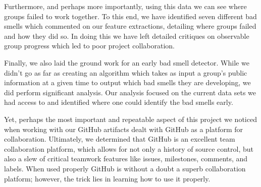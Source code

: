 \documentclass{acm_proc_article-sp}
\begin{document}
Furthermore, and perhaps more importantly, using this data we can see where groups failed to work together. To this end, we have identified seven different bad smells which commented on our feature extractions, detailing where groups failed and how they did so. In doing this we have left detailed critiques on observable group progress which led to poor project collaboration.

Finally, we also laid the ground work for an early bad smell detector. While we didn't go as far as creating an algorithm which takes as input a group's public information at a given time to output which bad smells they are developing, we did perform significant analysis. Our analysis focused on the current data sets we had access to and identified where one could identify the bad smells early.

Yet, perhaps the most important and repeatable aspect of this project we noticed when working with our GitHub artifacts dealt with GitHub as a platform for collaboration. Ultimately, we determined that GitHub is an excellent team collaboration platform, which allows for not only a history of source control, but also a slew of critical teamwork features like issues, milestones, comments, and labels. When used properly GitHub is without a doubt a superb collaboration platform; however, the trick lies in learning how to use it properly.




\end{document}
